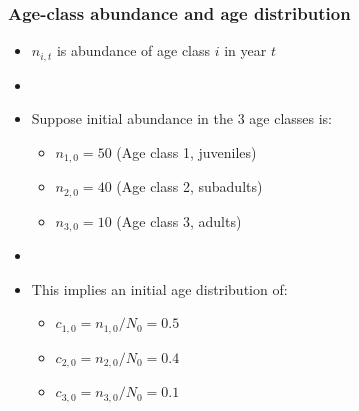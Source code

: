 \documentclass[color=usenames,dvipsnames]{beamer}\usepackage[]{graphicx}\usepackage[]{color}
\begin{document}








\begin{frame}
  \frametitle{Age-class abundance and age distribution}
  \large
  \begin{itemize}%
    \item $n_{i,t}$ is abundance of age class $i$ in year $t$
    \item[]
    \item<2-> Suppose initial abundance in the 3 age classes is:
      \begin{itemize} \large
        \item $n_{1,0} = 50$ (Age class 1, juveniles)
        \item $n_{2,0} = 40$ (Age class 2, subadults)
        \item $n_{3,0} = 10$ (Age class 3, adults)
      \end{itemize}
    \item[]
    \item<3-> This implies an initial age distribution of:
      \begin{itemize} \large
        \item  $c_{1,0} = n_{1,0}/N_0 = 0.5$
        \item  $c_{2,0} = n_{2,0}/N_0 = 0.4$
        \item  $c_{3,0} = n_{3,0}/N_0 = 0.1$
      \end{itemize}
  \end{itemize}
  \vfill
\end{frame}
\end{document}
